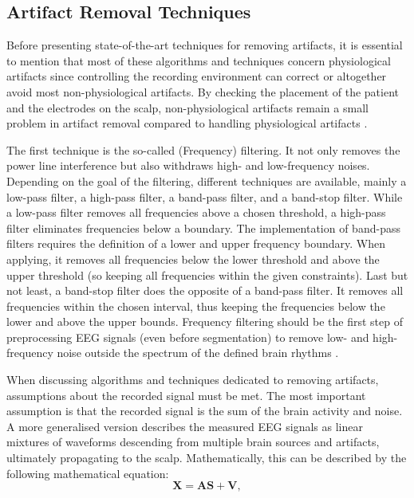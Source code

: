     \subsection{Artifact Removal Techniques}
      Before presenting state-of-the-art techniques for removing artifacts, it is essential to mention that most of these algorithms and techniques concern physiological artifacts since controlling the recording environment can correct or altogether avoid most non-physiological artifacts. By checking the placement of the patient and the electrodes on the scalp, non-physiological artifacts remain a small problem in artifact removal compared to handling physiological artifacts \cite{hu2019eeg,Uriguen_2015}. \par
      The first technique is the so-called (Frequency) filtering. It not only removes the power line interference but also withdraws high- and low-frequency noises. Depending on the goal of the filtering, different techniques are available, mainly a low-pass filter, a high-pass filter, a band-pass filter, and a band-stop filter. While a low-pass filter removes all frequencies above a chosen threshold, a high-pass filter eliminates frequencies below a boundary. The implementation of band-pass filters requires the definition of a lower and upper frequency boundary. When applying, it removes all frequencies below the lower threshold and above the upper threshold (so keeping all frequencies within the given constraints). Last but not least, a band-stop filter does the opposite of a band-pass filter. It removes all frequencies within the chosen interval, thus keeping the frequencies below the lower and above the upper bounds. Frequency filtering should be the first step of preprocessing \ac{EEG} signals (even before segmentation) to remove low- and high-frequency noise outside the spectrum of the defined brain rhythms \cite{hu2019eeg}. \par
      When discussing algorithms and techniques dedicated to removing artifacts, assumptions about the recorded signal must be met. The most important assumption is that the recorded signal is the sum of the brain activity and noise. A more generalised version describes the measured \ac{EEG} signals as linear mixtures of waveforms descending from multiple brain sources and artifacts, ultimately propagating to the scalp. Mathematically, this can be described by the following mathematical equation: 
      \begin{equation}
        \mathbf{X} = \mathbf{A}\mathbf{S} + \mathbf{V},
        \label{eq:mixing}
      \end{equation}
